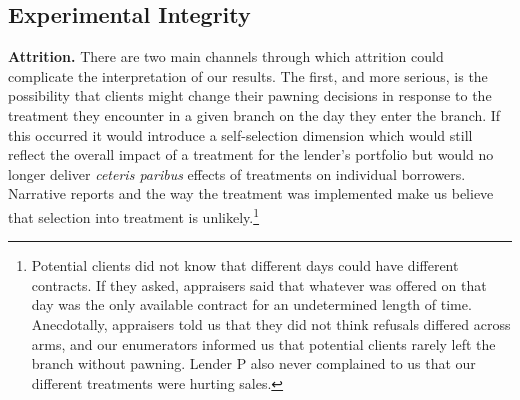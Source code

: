 \documentclass[11pt, a4paper]{article}
\begin{document}
\subsection{Experimental Integrity}
\label{sec:integrity}

\vspace{.2in}
\noindent \textbf{Attrition.} There are two main channels through which attrition could complicate the interpretation of our results. The first, and more serious, is the possibility that clients might change their pawning decisions in response to the treatment they encounter in a given branch on the day they enter the branch.  If this occurred it would introduce a self-selection dimension which would still reflect the overall impact of a treatment for the lender's portfolio but would no longer deliver \textit{ceteris paribus} effects of treatments on individual borrowers.  Narrative reports and the way the treatment was implemented make us believe that selection into treatment is unlikely.\footnote{Potential clients did not know that different days could have different contracts. If they asked, appraisers said that whatever was offered on that day was the only available contract for an undetermined length of time. Anecdotally, appraisers told us that they did not think refusals differed across arms, and our enumerators informed us that potential clients rarely left the branch without pawning. Lender P also never complained to us that our different treatments were hurting sales.} 
\end{document}
